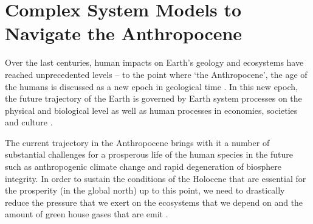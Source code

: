 \section{Complex System Models to Navigate the Anthropocene}
\label{sec:intro_complex_systems}

Over the last centuries, human impacts on Earth's geology and ecosystems have reached unprecedented levels -- to the point where `the Anthropocene', the age of the humans is discussed as a new epoch in geological time \citep{Crutzen2006, Zal2008, Zal2010, Steffen2011}. In this new epoch, the future trajectory of the Earth is governed by Earth system processes on the physical and biological level as well as human processes in economies, societies and culture \citep{Steffen2007, Lewis2015, Crutzen2016}.

The current trajectory in the Anthropocene brings with it a number of substantial challenges for a prosperous life of the human species in the future such as anthropogenic climate change and rapid degeneration of biosphere integrity. In order to sustain the conditions of the Holocene that are essential for the prosperity (in the global north) up to this point, we need to drastically reduce the pressure that we exert on the ecosystems that we depend on and the amount of green house gases that are emit \citep{Rockstrom2009a, Rockstrom2009, Steffen2015a}.

